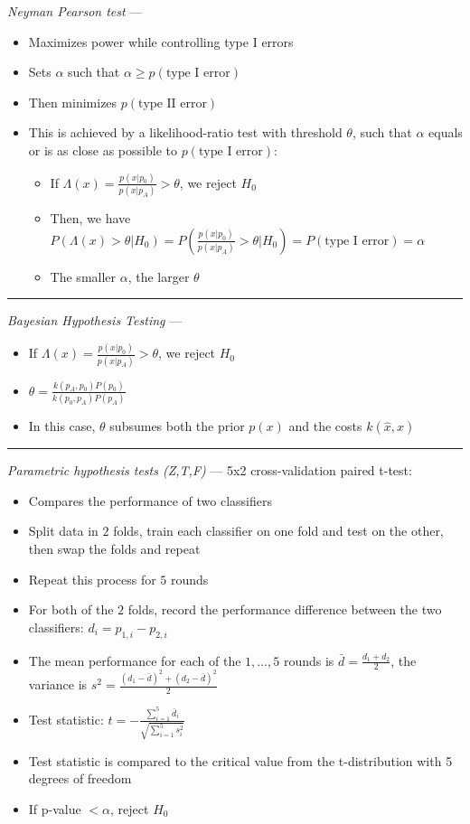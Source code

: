 \emph{Neyman Pearson test} ---
\begin{itemize}
    \item Maximizes power while controlling type I errors
    \item Sets $\alpha$ such that $\alpha \geq p(\textrm{type I error})$

    \item Then minimizes $p(\textrm{type II error})$
    \item This is achieved by a likelihood-ratio test with threshold $\theta$, such that $\alpha$ equals or is as close as possible to $ p(\textrm{type I error})$: 
    \begin{itemize}
        \item If $\Lambda(x) = \frac{p(x|p_0)}{p(x|p_A)} > \theta$, we reject $H_0$
        \item Then, we have $P(\Lambda(x) > \theta | H_0) = P(\frac{p(x|p_0)}{p(x|p_A)} > \theta | H_0 ) = P(\textrm{type I error}) = \alpha$
        \item The smaller $\alpha$, the larger $\theta$
    \end{itemize}
\end{itemize}

{\color{lightgray}\hrule height 0.001mm}

\emph{Bayesian Hypothesis Testing} ---
\begin{itemize}
    \item If $\Lambda(x) = \frac{p(x|p_0)}{p(x|p_A)} > \theta$, we reject $H_0$
    \item $\theta = \frac{k(p_A,p_0)P(p_0)}{k(p_0,p_A)P(p_A)}$
    \item In this case, $\theta$ subsumes both the prior $p(x)$ and the costs $k(\hat{x},x)$
\end{itemize}

{\color{lightgray}\hrule height 0.001mm}

\emph{Parametric hypothesis tests (Z,T,F)} --- 
5x2 cross-validation paired t-test:
\begin{itemize}
    \item Compares the performance of two classifiers
    \item Split data in $2$ folds, train each classifier on one fold and test on the other, then swap the folds and repeat
    \item Repeat this process for $5$ rounds
    \item For both of the $2$ folds, record the performance difference between the two classifiers: $d_i = p_{1,i} - p_{2,i}$
    \item The mean performance for each of the $1,...,5$ rounds is $\bar{d} = \frac{d_1+d_2}{2}$, the variance is $s^2 = \frac{(d_1-\bar{d})^2 + (d_2-\bar{d})^2}{2}$
    \item Test statistic: $t = -\frac{\sum_{i=1}^5 \bar{d}_i}{\sqrt{\sum_{i=1}^5 s_i^2}}$
    \item Test statistic is compared to the critical value from the t-distribution with 5 degrees of freedom
    \item If p-value $< \alpha$, reject $H_0$
\end{itemize}

